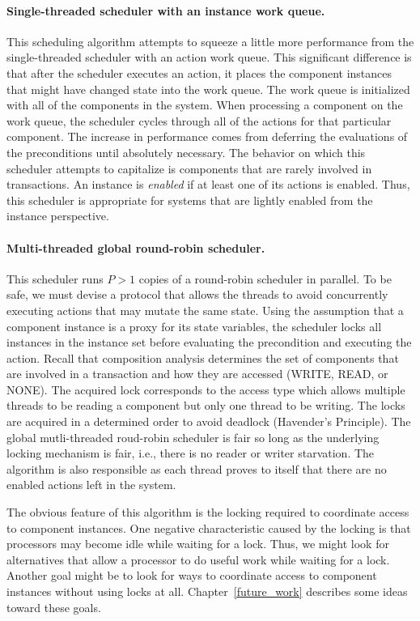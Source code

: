 \paragraph{Single-threaded scheduler with an instance work queue.}
This scheduling algorithm attempts to squeeze a little more performance from the single-threaded scheduler with an action work queue.
This significant difference is that after the scheduler executes an action, it places the component instances that might have changed state into the work queue.
The work queue is initialized with all of the components in the system.
When processing a component on the work queue, the scheduler cycles through all of the actions for that particular component.
The increase in performance comes from deferring the evaluations of the preconditions until absolutely necessary.
The behavior on which this scheduler attempts to capitalize is components that are rarely involved in transactions.
An instance is \emph{enabled} if at least one of its actions is enabled.
Thus, this scheduler is appropriate for systems that are lightly enabled from the instance perspective.

\paragraph{Multi-threaded global round-robin scheduler.}
This scheduler runs $P > 1$ copies of a round-robin scheduler in parallel.
To be safe, we must devise a protocol that allows the threads to avoid concurrently executing actions that may mutate the same state.
Using the assumption that a component instance is a proxy for its state variables, the scheduler locks all instances in the instance set before evaluating the precondition and executing the action.
Recall that composition analysis determines the set of components that are involved in a transaction and how they are accessed (WRITE, READ, or NONE).
The acquired lock corresponds to the access type which allows multiple threads to be reading a component but only one thread to be writing.
The locks are acquired in a determined order to avoid deadlock (Havender's Principle).
The global mutli-threaded roud-robin scheduler is fair so long as the underlying locking mechanism is fair, i.e., there is no reader or writer starvation.
The algorithm is also responsible as each thread proves to itself that there are no enabled actions left in the system.

The obvious feature of this algorithm is the locking required to coordinate access to component instances.
One negative characteristic caused by the locking is that processors may become idle while waiting for a lock.
Thus, we might look for alternatives that allow a processor to do useful work while waiting for a lock.
Another goal might be to look for ways to coordinate access to component instances without using locks at all.
Chapter~\ref{future_work} describes some ideas toward these goals.

